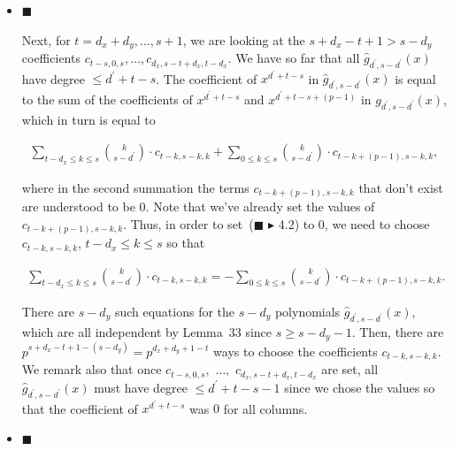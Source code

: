 \begin{itemize}
\item[] 
$\blacksquare$ 


Next, for $t=d_{x}+d_{y},\dots,s+1$, we are looking at the $s+d_{x}-t+1>s-d_{y}$ coefficients $c_{t-s,0,s},\dots,c_{d_{x},s-t+d_{x},t-d_{x}}$. We have so far that all $\hat{g}_{d^{\prime},s-d^{\prime}}(x)$ have degree $\leq d^{\prime}+t-s$. The coefficient of $x^{d^{\prime}+t-s}$ in $\hat{g}_{d^{\prime},s-d^{\prime}}(x)$ is equal to the sum of the coefficients of $x^{d^{\prime}+t-s}$ and $x^{d^{\prime}+t-s+(p-1)}$ in $g_{d^{\prime},s-d^{\prime}}(x)$, which in turn is equal to\par


\[\begin{gathered}
\sum_{t-d_{x}\leq k\leq s}\binom{k}{s-d^{\prime}}\cdot c_{t-k,s-k,k}+\sum_{0\leq k\leq s}\binom{k}{s-d^{\prime}}\cdot c_{t-k+(p-1),s-k,k},
\end{gathered}\]


where in the second summation the terms $c_{t-k+(p-1),s-k,k}$ that don’t exist are understood to be $0$. Note that we’ve already set the values of $c_{t-k+(p-1),s-k,k}$. Thus, in order to set ($\blacksquare$ \ensuremath{\blacktriangleright} 4.2) to $0$, we need to choose $c_{t-k,s-k,k}$, $t-d_{x}\leq k\leq s$ so that\par


\[\begin{gathered}
\sum_{t-d_{x}\leq k\leq s}\binom{k}{s-d^{\prime}}\cdot c_{t-k,s-k,k}=-\sum_{0\leq k\leq s}\binom{k}{s-d^{\prime}}\cdot c_{t-k+(p-1),s-k,k}.
\end{gathered}\]


There are $s-d_{y}$ such equations for the $s-d_{y}$ polynomials $\hat{g}_{d^{\prime},s-d^{\prime}}(x)$, which are all independent by Lemma 33 since $s\geq s-d_{y}-1$. Then, there are $p^{s+d_{x}-t+1-(s-d_{y})}=p^{d_{x}+d_{y}+1-t}$ ways to choose the coefficients $c_{t-k,s-k,k}$. We remark also that once $c_{t-s,0,s},$ $\dots,$ $c_{d_{x},s-t+d_{x},t-d_{x}}$ are set, all $\hat{g}_{d^{\prime},s-d^{\prime}}(x)$ must have degree $\leq d^{\prime}+t-s-1$ since we chose the values so that the coefficient of $x^{d^{\prime}+t-s}$ was $0$ for all columns.\par





\item[] 
$\blacksquare$ 



\end{itemize}
